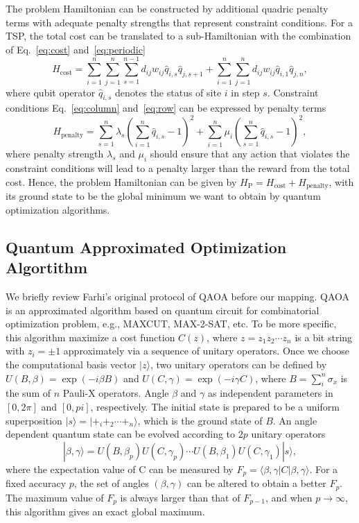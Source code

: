 \documentclass[aps,pra,twocolumn,superscriptaddress]{revtex4-2}
\begin{document}
The problem Hamiltonian can be constructed by additional quadric penalty terms with adequate penalty strengths that represent constraint conditions. For a TSP, the total cost can be translated to a sub-Hamiltonian with the combination of Eq.~\eqref{eq:cost} and~\eqref{eq:periodic}
\begin{equation}
H_{\text{cost}}=\sum_{i=1}^n\sum_{j=1}^n\sum_{s=1}^{n-1}d_{ij}w_{ij}\hat{q}_{i,s}\hat{q}_{j,s+1}+\sum_{i=1}^n\sum_{j=1}^nd_{ij}w_{ij}\hat{q}_{i,1}\hat{q}_{j,n},
\end{equation}
where qubit operator $\hat{q}_{i,s}$ denotes the status of site $i$ in step $s$. Constraint conditions Eq.~\eqref{eq:column} and~\eqref{eq:row} can be expressed by penalty terms
\begin{equation}
H_{\text{penalty}}=\sum_{s=1}^n\lambda_s(\sum_{i=1}^n\hat{q}_{i,s}-1)^2+\sum_{i=1}^n\mu_i(\sum_{s=1}^n\hat{q}_{i,s}-1)^2,
\end{equation}
where penalty strength $\lambda_s$ and $\mu_i$ should ensure that any action that violates the constraint conditions will lead to a penalty larger than the reward from the total cost. Hence, the problem Hamiltonian can be given by $H_{\text{P}}=H_{\text{cost}}+H_{\text{penalty}}$, with its ground state to be the global minimum we want to obtain by quantum optimization algorithms.

\subsection{Quantum Approximated Optimization Algortithm}
We briefly review Farhi's original protocol of QAOA before our mapping. QAOA is an approximated algorithm based on quantum circuit for combinatorial optimization problem, e.g., MAXCUT, MAX-2-SAT, etc. To be more specific, this algorithm maximize a cost function $C(z)$, where $z=z_1z_2\cdots z_n$ is a bit string with $z_i=\pm1$ approximately via a sequence of unitary operators. Once we choose the computational basis vector $|z\rangle$, two unitary operators can be defined by $U(B,\beta)=\exp(-i\beta B)$ and  $U(C,\gamma)=\exp(-i\gamma C)$, where $B=\sum_i^n \sigma_x$ is the sum of $n$ Pauli-X operators. Angle $\beta$ and $\gamma$ as independent parameters in $[0,2\pi]$ and $[0,pi]$, respectively. The initial state is prepared to be a uniform superposition $|s\rangle=|+_i+_2\cdots+_n\rangle$, which is the ground state of $B$. An angle dependent quantum state can be evolved according to $2p$ unitary operators
\begin{equation}
|\beta,\gamma\rangle=U(B,\beta_p)U(C,\gamma_p)\cdots U(B,\beta_1)U(C,\gamma_1)|s\rangle,
\end{equation}
where the expectation value of C can be measured by $F_p=\langle\beta,\gamma|C|\beta,\gamma\rangle$. For a fixed accuracy $p$, the set of angles $(\beta,\gamma)$ can be altered to obtain a better $F_p$. The maximum value of $F_p$ is always larger than that of $F_{p-1}$, and when $p\rightarrow\infty$, this algorithm gives an exact global maximum.
\end{document}
